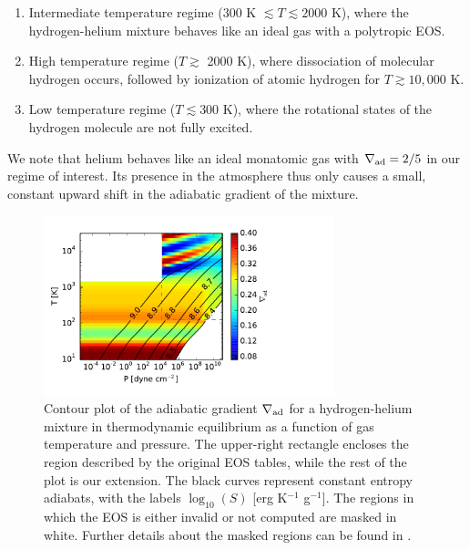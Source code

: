 \begin{enumerate}
\item Intermediate temperature regime (300 K $\lesssim T \lesssim 2000$ K), where the hydrogen-helium mixture behaves like an ideal gas with a polytropic EOS.
\item High temperature regime ($T \gtrsim$ 2000 K), where dissociation of molecular hydrogen occurs, followed by ionization of atomic hydrogen for $T \gtrsim 10,000$ K.
\item Low temperature regime ($T \lesssim 300$ K), where the rotational states of the hydrogen molecule are not fully excited. %
\end{enumerate}

We note that helium behaves like an ideal monatomic gas with $\nabla_{\rm ad}=2/5$ in our regime of interest.  Its presence in the atmosphere thus only causes a small, constant upward shift in the adiabatic gradient of the mixture.

\begin{figure}[H]
\centering
\includegraphics[width=0.75\textwidth]{figures/delad_S_mixt.pdf}
\caption{Contour plot of the adiabatic gradient $\nabla_{\rm ad}$ for a hydrogen-helium mixture in thermodynamic equilibrium as a function of gas temperature and pressure. The upper-right rectangle encloses the region described by the original \citet{saumon95} EOS tables, while the rest of the plot is our extension. The black curves represent constant entropy adiabats, with the labels $\log_{10}(S)$ [erg K$^{-1}$ g$^{-1}$]. The regions in which the EOS is either invalid or not computed are masked in white. Further details about the masked regions can be found in .}
\label{fig:deladmap}
\end{figure}

